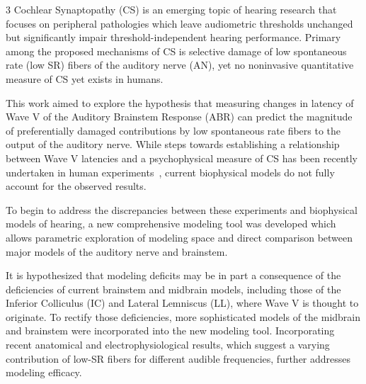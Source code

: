 	3%
Cochlear Synaptopathy (CS) is an emerging topic of hearing research that focuses on peripheral pathologies which leave audiometric thresholds unchanged but significantly impair threshold-independent hearing performance. Primary among the proposed mechanisms of CS is selective damage of low spontaneous rate (low SR) fibers of the auditory nerve (AN), yet no noninvasive quantitative measure of CS yet exists in humans.

This work aimed to explore the hypothesis that measuring changes in latency of Wave V of the Auditory Brainstem Response (ABR) can predict the magnitude of preferentially damaged contributions by low spontaneous rate fibers to the output of the auditory nerve. While steps towards establishing a relationship between Wave V latencies and a psychophysical measure of CS has been recently undertaken in human experiments~\citep{Mehraei2016Auditory}, current biophysical models do not fully account for the observed results.

To begin to address the discrepancies between these experiments and biophysical models of hearing, a new comprehensive modeling tool was developed which allows parametric exploration of modeling space and direct comparison between major models of the auditory nerve and brainstem. 

It is hypothesized that modeling deficits may be in part a consequence of the deficiencies of current brainstem and midbrain models, including those of the Inferior Colliculus (IC) and Lateral Lemniscus (LL), where Wave V is thought to originate.  To rectify those deficiencies, more sophisticated models of the midbrain and brainstem were incorporated into the new modeling tool. Incorporating recent anatomical and electrophysiological results, which suggest a varying contribution of low-SR fibers for different audible frequencies, further addresses modeling efficacy.
